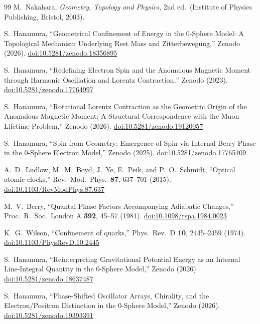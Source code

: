 \documentclass[%
 reprint, amsmath,amssymb, aps, prb, ]{revtex4-2}
\numberwithin{equation}{section}
\begin{document}
\begin{thebibliography}{99}
M.~Nakahara, \textit{Geometry, Topology and Physics}, 2nd ed.\ (Institute of Physics Publishing, Bristol, 2003).

S.~Hanamura, ``Geometrical Confinement of Energy in the 0-Sphere Model: A Topological Mechanism Underlying Rest Mass and Zitterbewegung,'' Zenodo (2026). \href{https://doi.org/10.5281/zenodo.18356895}{doi:10.5281/zenodo.18356895}

S.~Hanamura, ``Redefining Electron Spin and the Anomalous Magnetic Moment through Harmonic Oscillation and Lorentz Contraction,'' Zenodo (2023). \href{https://doi.org/10.5281/zenodo.17764997}{doi:10.5281/zenodo.17764997}

S.~Hanamura, ``Rotational Lorentz Contraction as the Geometric Origin of the Anomalous Magnetic Moment: A Structural Correspondence with the Muon Lifetime Problem,'' Zenodo (2026). \href{https://doi.org/10.5281/zenodo.19120057}{doi:10.5281/zenodo.19120057}

S.~Hanamura, ``Spin from Geometry: Emergence of Spin via Internal Berry Phase in the 0-Sphere Electron Model,'' Zenodo (2025). \href{https://doi.org/10.5281/zenodo.17765409}{doi:10.5281/zenodo.17765409}

A.~D.~Ludlow, M.~M.~Boyd, J.~Ye, E.~Peik, and P.~O.~Schmidt, ``Optical atomic clocks,'' Rev.\ Mod.\ Phys.\ \textbf{87}, 637--701 (2015). \href{https://doi.org/10.1103/RevModPhys.87.637}{doi:10.1103/RevModPhys.87.637}

M.~V.~Berry, ``Quantal Phase Factors Accompanying Adiabatic Changes,'' Proc.\ R.\ Soc.\ London A \textbf{392}, 45--57 (1984). \href{https://doi.org/10.1098/rspa.1984.0023}{doi:10.1098/rspa.1984.0023}

K.~G.~Wilson, ``Confinement of quarks,'' Phys.\ Rev.\ D \textbf{10}, 2445--2459 (1974). \href{https://doi.org/10.1103/PhysRevD.10.2445}{doi:10.1103/PhysRevD.10.2445}

S.~Hanamura, ``Reinterpreting Gravitational Potential Energy as an Internal Line-Integral Quantity in the 0-Sphere Model,'' Zenodo (2026). \href{https://doi.org/10.5281/zenodo.18637487}{doi:10.5281/zenodo.18637487}

S.~Hanamura, ``Phase-Shifted Oscillator Arrays, Chirality, and the Electron/Positron Distinction in the 0-Sphere Model,'' Zenodo (2026). \href{https://doi.org/10.5281/zenodo.19393391}{doi:10.5281/zenodo.19393391}


\end{thebibliography}
\end{document}
